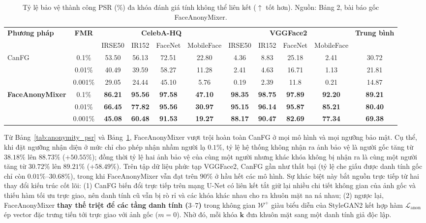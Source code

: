\begin{table}[H]
\centering
\scriptsize
\setlength{\tabcolsep}{3.5pt}
\caption{Tỷ lệ bảo vệ thành công PSR (\%) đa khóa đánh giá tính không thể liên kết ($\uparrow$ tốt hơn). Nguồn: Bảng 2, bài báo gốc FaceAnonyMixer.}
\label{tab:unlinkability_psr}
\begin{tabular}{|l|c|cccc|cccc|c|}
\hline
\multirow{2}{*}{\textbf{Phương pháp}} & \multirow{2}{*}{\textbf{FMR}} & \multicolumn{4}{c|}{\textbf{CelebA-HQ}} & \multicolumn{4}{c|}{\textbf{VGGFace2}} & \multirow{2}{*}{\textbf{Trung bình}} \\
\cline{3-10}
 & & IRSE50 & IR152 & FaceNet & MobileFace & IRSE50 & IR152 & FaceNet & MobileFace & \\
\hline
\multirow{3}{*}{CanFG} & 0.1\% & 53.50 & 56.13 & 72.51 & 22.80 & 4.36 & 8.83 & 25.18 & 2.41 & 30.72 \\
 & 0.01\% & 40.49 & 39.59 & 58.27 & 11.28 & 2.41 & 4.63 & 16.71 & 1.13 & 21.81 \\
 & 0.001\% & 29.05 & 24.44 & 45.10 & 5.76 & 0.19 & 2.39 & 11.8 & 0.21 & 14.87 \\
\hline
\multirow{3}{*}{\textbf{FaceAnonyMixer}} & 0.1\% & \textbf{86.21} & \textbf{95.56} & \textbf{97.58} & \textbf{47.10} & \textbf{98.35} & \textbf{98.75} & \textbf{97.89} & \textbf{92.20} & \textbf{89.21} \\
 & 0.01\% & \textbf{66.45} & \textbf{77.82} & \textbf{95.56} & \textbf{30.97} & \textbf{95.15} & \textbf{96.14} & \textbf{95.87} & \textbf{85.21} & \textbf{80.40} \\
 & 0.001\% & \textbf{45.08} & \textbf{60.48} & \textbf{91.53} & \textbf{19.27} & \textbf{88.17} & \textbf{90.47} & \textbf{82.69} & \textbf{77.34} & \textbf{69.38} \\
\hline
\end{tabular}
\end{table}

Từ Bảng~\ref{tab:anonymity_psr} và Bảng~\ref{tab:unlinkability_psr}, FaceAnonyMixer vượt trội hoàn toàn CanFG ở mọi mô hình và mọi ngưỡng bảo mật. Cụ thể, khi đặt ngưỡng nhận diện ở mức chỉ cho phép nhận nhầm người lạ $0.1\%$, tỷ lệ hệ thống không nhận ra ảnh bảo vệ là người gốc tăng từ $38.18\%$ lên $88.73\%$ ($+50.55\%$); đồng thời tỷ lệ hai ảnh bảo vệ của cùng một người nhưng khác khóa không bị nhận ra là cùng một người tăng từ $30.72\%$ lên $89.21\%$ ($+58.49\%$). Trên tập dữ liệu phức tạp VGGFace2, CanFG gần như thất bại (tỷ lệ che giấu được danh tính gốc chỉ còn $0.01\%\text{--}30.68\%$), trong khi FaceAnonyMixer vẫn đạt trên $90\%$ ở hầu hết các mô hình. Sự khác biệt này bắt nguồn trực tiếp từ hai thay đổi kiến trúc cốt lõi: (1) CanFG biến đổi trực tiếp trên mạng U-Net có liên kết tắt giữ lại nhiều chi tiết không gian của ảnh gốc và thiếu hàm tối ưu trực giao, nên danh tính cũ vẫn bị rò rỉ và các khóa khác nhau cho ra khuôn mặt na ná nhau; (2) ngược lại, FaceAnonyMixer \textbf{thay thế triệt để các tầng danh tính ($3\text{--}7$)} trong không gian $\mathcal{W}^+$ giàu biểu diễn của StyleGAN2 kết hợp hàm $\mathcal{L}_{\text{anon}}$ ép vector đặc trưng tiến tới trực giao với ảnh gốc ($m=0$). Nhờ đó, mỗi khóa $\mathbf{k}$ đưa khuôn mặt sang một danh tính giả độc lập.

